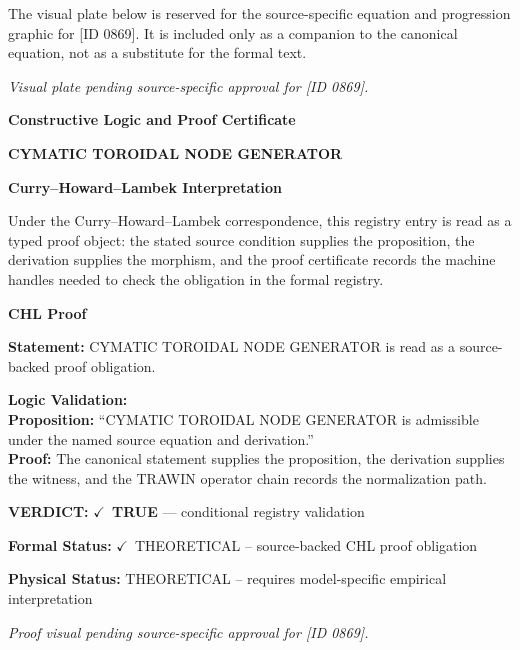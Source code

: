 \begingroup\footnotesize\sloppy
The visual plate below is reserved for the source-specific equation and progression graphic for [ID 0869]. It is included only as a companion to the canonical equation, not as a substitute for the formal text.
\par\endgroup
\begingroup\footnotesize\itshape
Visual plate pending source-specific approval for [ID 0869].
\par\endgroup

\clearpage
\begingroup\tzpsupportsetup
\noindent\textbf{\fontsize{10.8pt}{12.8pt}\selectfont [ID 0869] Constructive Logic and Proof Certificate}\par
\noindent\textbf{\fontsize{10pt}{12pt}\selectfont CYMATIC TOROIDAL NODE GENERATOR}\par
\vspace{0.45em}
\begingroup
\footnotesize
\setlength{\parskip}{0.22em}
\setlength{\parindent}{0pt}
\noindent\textbf{Curry--Howard--Lambek Interpretation}\par
Under the Curry--Howard--Lambek correspondence, this registry entry is read as a typed proof
object: the stated source condition supplies the proposition, the derivation supplies the
morphism, and the proof certificate records the machine handles needed to check the obligation
in the formal registry.

\vspace{0.45em}
\noindent\textbf{CHL Proof}\par
\textbf{Statement:} CYMATIC TOROIDAL NODE GENERATOR is read as a source-backed proof obligation.

\textbf{Logic Validation:}\\
\textbf{Proposition:} ``CYMATIC TOROIDAL NODE GENERATOR is admissible under the named source equation and derivation.''\\
\textbf{Proof:} The canonical statement supplies the proposition, the derivation supplies the witness, and the TRAWIN operator chain records the normalization path.

\textbf{VERDICT:} \ensuremath{\checkmark}\ \textbf{TRUE} --- conditional registry validation

\textbf{Formal Status:} \ensuremath{\checkmark}\ THEORETICAL -- source-backed CHL proof obligation

\textbf{Physical Status:} THEORETICAL -- requires model-specific empirical interpretation
\par\vspace{0.45em}
\par
\vfill
\begingroup\footnotesize\itshape
Proof visual pending source-specific approval for [ID 0869].
\par\endgroup
\vfill
\endgroup
\endgroup
